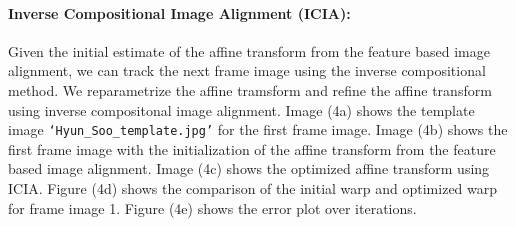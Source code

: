 \documentclass[11pt]{scrartcl}
\begin{document}
\paragraph{\textbf{Inverse Compositional Image Alignment (ICIA):}}
Given the initial estimate of the affine transform from the feature based image alignment, we can track the next frame image using the inverse compositional method. We reparametrize the affine tramsform and refine the affine transform using inverse compositonal image alignment. Image (4a) shows the template image \texttt{`Hyun\_Soo\_template.jpg'} for the first frame image. Image (4b) shows the first frame image with the initialization of the affine transform from the feature based image alignment. Image (4c) shows the optimized affine transform using ICIA. Figure (4d) shows the comparison of the initial warp and optimized warp for frame image 1. Figure (4e) shows the error plot over iterations.
\end{document}
